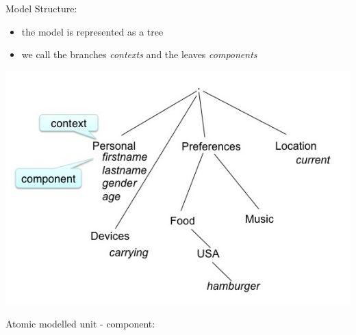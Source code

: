 \documentclass[letterpaper,10pt,english]{sphinxmanual}
\begin{document}
Model Structure:
\begin{itemize}
\item {} 
the model is represented as a tree

\item {} 
we call the branches \emph{contexts} and the leaves \emph{components}

\end{itemize}

\includegraphics{model-tree.jpg}

Atomic modelled unit - component:
\end{document}
